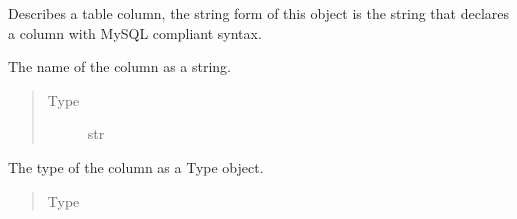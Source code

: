 \documentclass[letterpaper,10pt,english]{sphinxmanual}
\begin{document}
\begin{fulllineitems}
\label{\detokenize{model:simple_sql.model.column.Column}}
\sphinxAtStartPar
Describes a table column, the string form of this object is the
string that declares a column with MySQL compliant syntax.

\begin{fulllineitems}
\label{\detokenize{model:simple_sql.model.column.Column.__name}}
\sphinxAtStartPar
The name of the column as a string.
\begin{quote}\begin{description}
\item[{Type}] \leavevmode
\sphinxAtStartPar
str

\end{description}\end{quote}

\end{fulllineitems}


\begin{fulllineitems}
\label{\detokenize{model:simple_sql.model.column.Column.__type}}
\sphinxAtStartPar
The type of the column as a Type object.
\begin{quote}\begin{description}
\item[{Type}] \leavevmode
\sphinxAtStartPar
{\hyperref[\detokenize{model:simple_sql.model.type.Type}]{}}


\end{description}
\end{quote}
\end{fulllineitems}
\end{fulllineitems}
\end{document}
